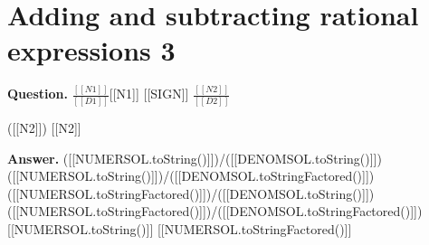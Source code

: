 \documentclass{article}
\begin{document}
\section*{Adding and subtracting rational expressions 3}
\textbf{Question.} $\frac{[[N1]]}{[[D1]]}$[[N1]]
            [[SIGN]]
            $\frac{[[N2]]}{[[D2]]}$
            
                ([[N2]])
                [[N2]]

\textbf{Answer.} ([[NUMERSOL.toString()]])/([[DENOMSOL.toString()]])
            ([[NUMERSOL.toString()]])/([[DENOMSOL.toStringFactored()]])
            ([[NUMERSOL.toStringFactored()]])/([[DENOMSOL.toString()]])
            ([[NUMERSOL.toStringFactored()]])/([[DENOMSOL.toStringFactored()]])
            [[NUMERSOL.toString()]]
            [[NUMERSOL.toStringFactored()]]
\end{document}
